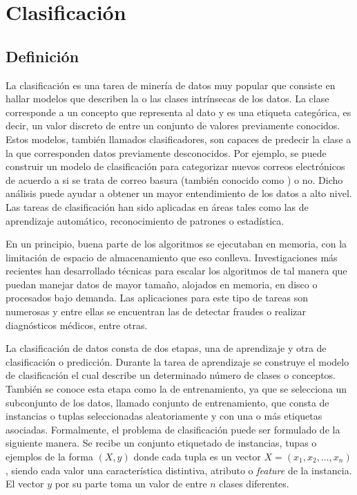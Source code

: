 \section{Clasificación}

\subsection{Definición}
\label{clasificacion}

La clasificación es una tarea de minería de datos muy popular que consiste en
hallar modelos que describen la o las clases intrínsecas de los datos. La clase
corresponde a un concepto que representa al dato y es una etiqueta categórica,
es decir, un valor discreto de entre un conjunto de valores previamente
conocidos. Estos modelos, también llamados clasificadores, son capaces de
predecir la clase a la que corresponden datos previamente desconocidos. Por
ejemplo, se puede construir un modelo de clasificación para categorizar nuevos
correos electrónicos  de acuerdo a si se trata de correo basura (también
conocido como ) o no. Dicho análisis puede ayudar a
obtener un mayor entendimiento de los datos a alto nivel. Las tareas de
clasificación han sido aplicadas en áreas tales como las de aprendizaje
automático, reconocimiento de patrones o estadística.

En un principio, buena parte de los algoritmos se ejecutaban en memoria, con la
limitación de espacio de almacenamiento que eso conlleva. Investigaciones más
recientes han desarrollado técnicas para escalar los algoritmos de tal manera
que puedan manejar datos de mayor tamaño, alojados en memoria, en disco o
procesados bajo demanda. Las aplicaciones para este tipo de tareas son numerosas
y entre ellas se encuentran las de detectar fraudes o realizar diagnósticos
médicos, entre otras.

La clasificación de datos consta de dos etapas, una de aprendizaje y otra de
clasificación o predicción. Durante la tarea de aprendizaje se construye el
modelo de clasificación  el cual describe un determinado número de clases o
conceptos. También se conoce esta etapa como la de entrenamiento, ya que se
selecciona un subconjunto de los datos, llamado conjunto de entrenamiento, que
consta de instancias o tuplas seleccionadas aleatoriamente y con una o más
etiquetas asociadas. Formalmente, el problema de clasificación puede ser
formulado de la siguiente manera. Se recibe un conjunto etiquetado de
instancias, tupas o ejemplos de la forma $( X, y )$ donde cada tupla es un
vector $X=(x_{1},x_{2},\dots,x_{n})$, siendo cada valor una característica
distintiva, atributo o \textit{feature} de la instancia. El vector $y$ por su
parte toma un valor de entre $n$ clases diferentes.

